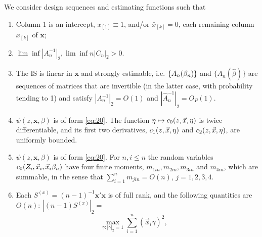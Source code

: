 \documentclass{article}
\theoremstyle{remark}
\begin{document}
We consider design sequences and estimating functions such that 
\renewcommand{\theenumi}{A\arabic{enumi}}
\begin{enumerate}
\item \label{A-centering} Column 1 is an intercept, $x_{[1]} \equiv 1$, and/or $\bar{x}_{[k]}=0$, each remaining column $x_{[k]}$ of $\mathbf{x}$;
\item \label{A-boundedinfo}
$\lim\inf |A_{n}^{-1}|_{2},  \lim\inf n|C_{n}|_{2} > 0 $.
\item\label{A-estimable} The IS is linear in $\mathbf{x}$ and strongly estimable, i.e.  $\{A_{n}(\beta_{n })\}$ and $\{A_{n}(\hat\beta)\}$ are sequences of matrices that are invertible (in the latter case, with probability tending to 1) and satisfy $|{A}_{n}^{-1}|_{2}=O(1)$ and $|\hat{A}_{n}^{-1}|_{2}= O_{P}(1)$. 
\item \label{A-psismooth} $\psi(z, \mathbf{x}, \beta)$ is of form
  \eqref{eq:20}. The function $\eta \mapsto c_{0}(z,\vec{x}, \eta)$ is
  twice differentiable, and its first two derivatives, $c_{1}(z,
  \vec{x}, \eta)$ and $c_{2}(z, \vec{x}, \eta)$, are uniformly bounded. 
\item \label{A-c0moments} $\psi(z, \mathbf{x}, \beta)$ is of form
  \eqref{eq:20}. For $n, i\leq n$ the random variables
  $c_{0}(Z_{i},\vec{x}_{i}, \vec{x}_{i}\beta_{n })$
have four finite moments, $m_{1in}, m_{2in}, m_{3in}$ and $m_{4in}$,
which are summable, in the sense that $\sum_{i=1}^{n} m_{jin} = O(n)$,
$j=1, 2, 3, 4$.
\item \label{A-l2Sfinite} Each $S^{(x)} = (n-1)^{-1}\mathbf{x}'\mathbf{x}$ is of full rank, and the following quantities are $O(n)$:  $|(n-1)S^{(x)}|_{2} =$ 
$$\max_{\gamma: |\gamma|_{2}=1} \sum_{i=1}^{n}(\vec{x}_{i}\gamma)^{2},\quad 
$$
\end{enumerate}
\end{document}
